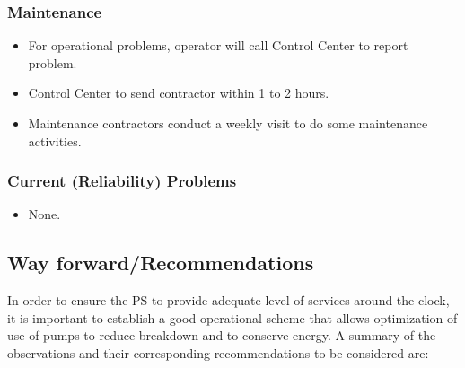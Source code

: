 \subsubsection{Maintenance}
\begin{itemize}
	\item For operational problems, operator will call Control Center to report problem. 
	\item Control Center to send contractor within 1 to 2 hours.
	\item Maintenance contractors conduct a weekly visit to do some maintenance activities.
\end{itemize}

\subsubsection{Current (Reliability) Problems}
\begin{itemize}
	\item None.
\end{itemize}

\subsection{Way forward/Recommendations}
In order to ensure the PS to provide adequate level of services around the clock, it is important to establish a good operational scheme that allows optimization of use of pumps to reduce breakdown and to conserve energy. A summary of the observations and their corresponding recommendations to be considered are:

